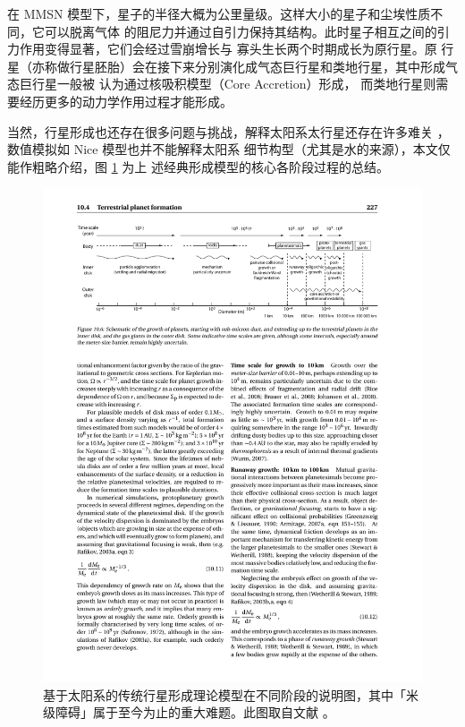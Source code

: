 在 MMSN 模型下，星子的半径大概为公里量级。这样大小的星子和尘埃性质不同，它可以脱离气体
的阻尼力并通过自引力保持其结构。此时星子相互之间的引力作用变得显著，它们会经过雪崩增长与
寡头生长两个时期成长为原行星\cite{Greenberg1978,Kokubo1996,Rafikov2003,Lissauer1993}。原
行星（亦称做行星胚胎）会在接下来分别演化成气态巨行星和类地行星，其中形成气态巨行星一般被
认为通过核吸积模型（Core Accretion）形成\cite{Mizuno1980,BodenheimerPollack1986,Pollack1996}，
而类地行星则需要经历更多的动力学作用过程才能形成\cite{Chambers1998}。

当然，行星形成也还存在很多问题与挑战，解释太阳系太行星还存在许多难关
\cite{Walsh2011,Morbidelli2005}，数值模拟如 Nice 模型\cite{Gomes2005Nice}也并不能解释太阳系
细节构型（尤其是水的来源\cite{Raymond2009}），本文仅能作粗略介绍，图 \ref{fig:pfstage} 为上
述经典形成模型的核心各阶段过程的总结。

\begin{figure}[t]
\centering
\includegraphics[width=1.0\textwidth]{figures/chapter1/fig11_pfsequence.pdf}
\caption[基于太阳系的传统行星形成理论模型在不同阶段的说明图，其中「米级障碍」属于至今为止的重大难题。图片版权 Michael Perryman。]{基于太阳系的传统行星形成理论模型在不同阶段的说明图，其中「米级障碍」属于至今为止的重大难题。此图取自文献 。}
\label{fig:pfstage}
\end{figure}



